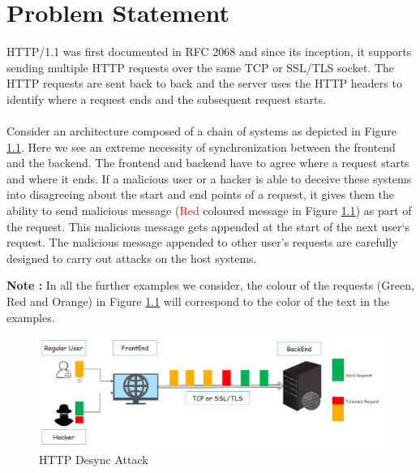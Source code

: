 \chapter{Problem Statement}
HTTP/1.1 was first documented in RFC 2068 \cite{b9} and since its inception, it supports sending multiple HTTP requests over the same TCP or SSL/TLS socket. The HTTP requests are sent back to back and the server uses the HTTP headers to identify where a request ends and the subsequent request starts. \\\\
Consider an architecture composed of a chain of systems as depicted in Figure \ref{fig:HTTP Desync Attack}. Here we see an extreme necessity of synchronization between the frontend and the backend. The frontend and backend have to agree where a request starts and where it ends. If a malicious user or a hacker is able to deceive these systems into disagreeing about the start and end points of a request, it gives them the ability to send malicious message (\textcolor{red}{Red} coloured message in Figure \ref{fig:HTTP Desync Attack}) as part of the request. This malicious message gets appended at the start of the next user`s request. The malicious message appended to other user's requests are carefully designed to carry out attacks on the host systems. 

\textbf{Note : }In all the further examples we consider, the colour of the requests (\textcolor{mygreen}{Green}, \textcolor{myred}{Red} and \textcolor{myorange}{Orange}) in Figure \ref{fig:HTTP Desync Attack} will correspond to the color of the text in the examples. 
\begin{figure}
	\includegraphics[width=14cm]{images/HTTP_Desync}
	\caption{HTTP Desync Attack}
	\label{fig:HTTP Desync Attack}
\end{figure}


